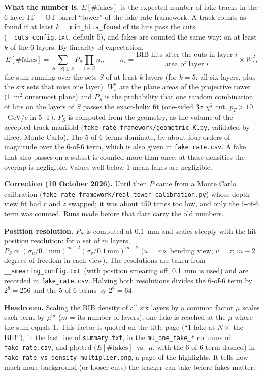 \documentclass[11pt,letterpaper]{article}
\newcommand{\code}[1]{\texttt{#1}}
\newcommand{\cuts}{\code{\_\_cuts\_config.txt}}
\newcommand{\smear}{\code{\_\_smearing\_config.txt}}
\newcommand{\Efakes}{\ensuremath{E[\#\mathrm{fakes}]}}
\begin{document}
\textbf{What the number is.} \Efakes\ is the expected number of fake tracks
in the 6-layer IT + OT barrel ``tower'' of the fake-rate framework. A track
counts as found if at least $k$ = \code{min\_hits\_found} of its hits pass
the cuts (\cuts, default 5), and fakes are counted the same way: on at least
$k$ of the 6 layers. By linearity of expectation,
\[
E[\#\mathrm{fakes}] = \sum_{S,\ |S|\ge k} P_S \prod_{i\in S} n_i ,\qquad
n_i = \frac{\text{BIB hits after the cuts in layer } i}{\text{area of layer } i}\times W_i^2,
\]
the sum running over the sets $S$ of at least $k$ layers (for $k=5$: all six
layers, plus the six sets that miss one layer). $W_i^2$ are the plane areas
of the projective tower (1~m$^2$ outermost plane) and $P_S$ is the
probability that one random combination of hits on the layers of $S$ passes
the exact-helix fit (one-sided $3\sigma$ $\chi^2$ cut, $p_T>10$~GeV/$c$ in
5~T). $P_S$ is computed from the geometry, as the volume of the accepted
track manifold (\code{fake\_rate\_framework/geometric\_K.py}, validated by
direct Monte Carlo). The 5-of-6 terms dominate, by about four orders of
magnitude over the 6-of-6 term, which is also given in \code{fake\_rate.csv}.
A fake that also passes on a subset is counted more than once; at these
densities the overlap is negligible. Values well below 1 mean fakes are
negligible.

\textbf{Correction (10 October 2026).} Until then $P$ came from a Monte
Carlo calibration (\code{fake\_rate\_framework/real\_tower\_calibration.py})
whose depth-view fit had $r$ and $z$ swapped; it was about 450 times too
low, and only the 6-of-6 term was counted. Runs made before that date carry
the old numbers.

\textbf{Position resolution.} $P_S$ is computed at 0.1~mm and scales
steeply with the hit position resolution: for a set of $m$ layers,
$P_S\propto(\sigma_u/0.1\,\mathrm{mm})^{m-2}(\sigma_v/0.1\,\mathrm{mm})^{m-2}$
($u$ = $r\phi$, bending view; $v$ = $z$; $m-2$ degrees of freedom in each
view). The resolutions are taken from \smear\ (with position smearing off,
0.1~mm is used) and are recorded in \code{fake\_rate.csv}. Halving both
resolutions divides the 6-of-6 term by $2^8=256$ and the 5-of-6 terms by
$2^6=64$.

\textbf{Headroom.} Scaling the BIB density of all six layers by a common
factor $\mu$ scales each term by $\mu^m$ ($m$ = its number of layers); one
fake is reached at the $\mu$ where the sum equals 1. This factor is
quoted on the title page (``1 fake at $N\times$ the BIB''), in the last line
of \code{summary.txt}, in the \code{mu\_one\_fake\_*} columns of
\code{fake\_rate.csv}, and plotted (\Efakes\ vs.\ $\mu$, with the 6-of-6
term dashed) in \code{fake\_rate\_vs\_density\_multiplier.png}, a page of
the highlights.
It tells how much more background (or looser cuts) the tracker can take
before fakes matter.
\end{document}
